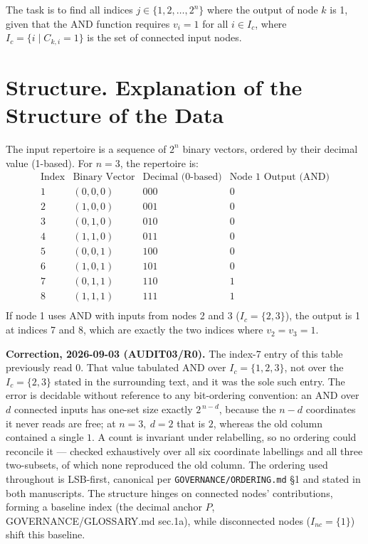 \documentclass[12pt]{article}
\begin{document}
The task is to find all indices \( j \in \{1, 2, \dots, 2^n\} \) where the output of node \( k \) is 1, given that the AND function requires \( v_i = 1 \) for all \( i \in I_c \), where \( I_c = \{i \mid C_{k,i} = 1\} \) is the set of connected input nodes.

\section{Structure. Explanation of the Structure of the Data}
The input repertoire is a sequence of \( 2^n \) binary vectors, ordered by their decimal value (1-based). For \( n = 3 \), the repertoire is:
\[
\begin{array}{cccc}
\text{Index} & \text{Binary Vector} & \text{Decimal (0-based)} & \text{Node 1 Output (AND)} \\
1 & (0, 0, 0) & 000 & 0 \\
2 & (1, 0, 0) & 001 & 0 \\
3 & (0, 1, 0) & 010 & 0 \\
4 & (1, 1, 0) & 011 & 0 \\
5 & (0, 0, 1) & 100 & 0 \\
6 & (1, 0, 1) & 101 & 0 \\
7 & (0, 1, 1) & 110 & 1 \\
8 & (1, 1, 1) & 111 & 1 \\
\end{array}
\]
If node 1 uses AND with inputs from nodes 2 and 3 (\( I_c = \{2, 3\} \)), the output is 1 at indices 7 and 8, which are exactly the two indices where \( v_2 = v_3 = 1 \).

\medskip
\noindent\textbf{Correction, 2026-09-03 (AUDIT03/R0).} The index-7 entry of this
table previously read \(0\). That value tabulated AND over \(I_c=\{1,2,3\}\), not
over the \(I_c=\{2,3\}\) stated in the surrounding text, and it was the sole such
entry. The error is decidable without reference to any bit-ordering convention:
an AND over \(d\) connected inputs has one-set size exactly \(2^{\,n-d}\), because
the \(n-d\) coordinates it never reads are free; at \(n=3,\ d=2\) that is \(2\),
whereas the old column contained a single \(1\). A count is invariant under
relabelling, so no ordering could reconcile it --- checked exhaustively over all
six coordinate labellings and all three two-subsets, of which none reproduced the
old column. The ordering used throughout is LSB-first, canonical per
\texttt{GOVERNANCE/ORDERING.md} \S1 and stated in both manuscripts. The structure hinges on connected nodes’ contributions, forming a baseline index (the decimal anchor \( P \), GOVERNANCE/GLOSSARY.md sec.1a), while disconnected nodes (\( I_{nc} = \{1\} \)) shift this baseline.
\end{document}
